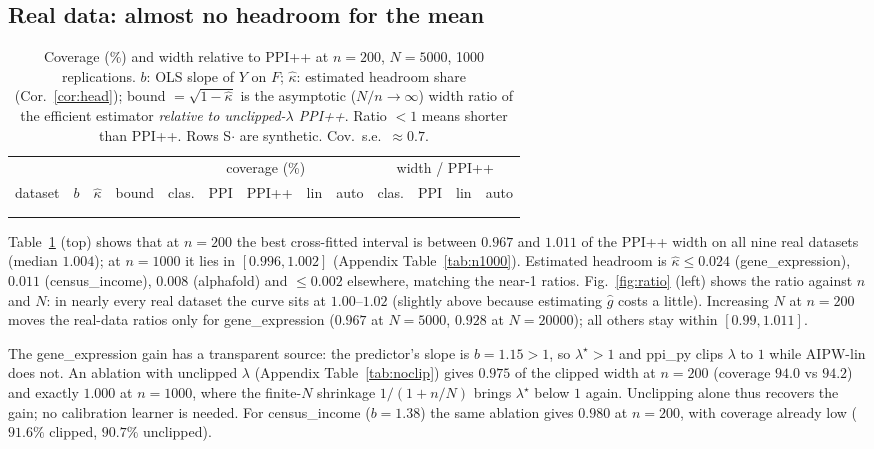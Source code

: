 \documentclass{article}
\begin{document}
\subsection{Real data: almost no headroom for the mean}\label{sec:real}
\begin{table}[t]
\caption{Coverage (\%) and width relative to PPI++ at $n=200$, $N=5000$, 1000 replications. $b$: OLS slope of $Y$ on $F$; $\hat\kappa$: estimated headroom share (Cor.~\ref{cor:head}); bound $=\sqrt{1-\hat\kappa}$ is the asymptotic ($N/n\to\infty$) width ratio of the efficient estimator \emph{relative to unclipped-$\lambda$ PPI++}. Ratio $<1$ means shorter than PPI++. Rows S$\cdot$ are synthetic. Cov.\ s.e.\ $\approx0.7$.}\label{tab:main}
\centering\scriptsize\setlength{\tabcolsep}{2.6pt}
\begin{tabular}{lrrr|ccccc|cccc}
\toprule
 & & & & \multicolumn{5}{c|}{coverage (\%)} & \multicolumn{4}{c}{width / PPI++} \\
dataset & $b$ & $\hat\kappa$ & bound & clas. & PPI & PPI++ & lin & auto & clas. & PPI & lin & auto \\
\midrule
\\
\midrule
\\
\bottomrule
\end{tabular}
\end{table}
Table~\ref{tab:main} (top) shows that at $n=200$ the best cross-fitted interval is between $0.967$ and $1.011$ of the PPI++ width on all nine real datasets (median $1.004$); at $n=1000$ it lies in $[0.996,1.002]$ (Appendix Table~\ref{tab:n1000}). Estimated headroom is $\hat\kappa\le0.024$ (gene\_expression), $0.011$ (census\_income), $0.008$ (alphafold) and $\le0.002$ elsewhere, matching the near-1 ratios. Fig.~\ref{fig:ratio} (left) shows the ratio against $n$ and $N$: in nearly every real dataset the curve sits at $1.00$--$1.02$ (slightly above because estimating $\hat g$ costs a little). Increasing $N$ at $n=200$ moves the real-data ratios only for gene\_expression ($0.967$ at $N=5000$, $0.928$ at $N=20000$); all others stay within $[0.99,1.011]$.

The gene\_expression gain has a transparent source: the predictor's slope is $b=1.15>1$, so $\lambda^\star>1$ and ppi\_py clips $\lambda$ to $1$ while AIPW-lin does not. An ablation with unclipped $\lambda$ (Appendix Table~\ref{tab:noclip}) gives $0.975$ of the clipped width at $n=200$ (coverage $94.0$ vs $94.2$) and exactly $1.000$ at $n=1000$, where the finite-$N$ shrinkage $1/(1+n/N)$ brings $\lambda^\star$ below $1$ again. Unclipping alone thus recovers the gain; no calibration learner is needed. For census\_income ($b=1.38$) the same ablation gives $0.980$ at $n=200$, with coverage already low ($91.6\%$ clipped, $90.7\%$ unclipped).
\end{document}
